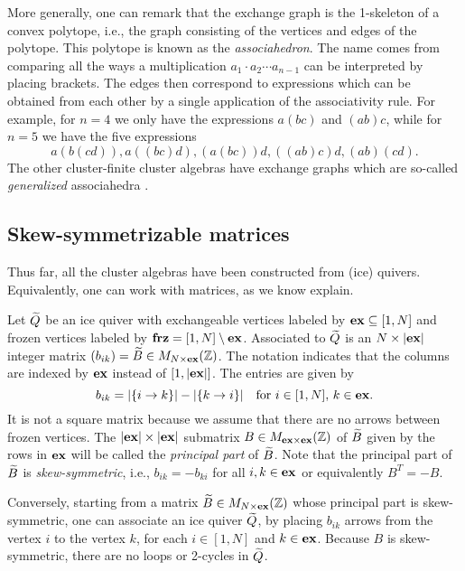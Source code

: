 More generally, one can remark that the exchange graph is the 1-skeleton of a convex
polytope, i.e., the graph consisting of the vertices and edges of the polytope. This
polytope is known as the \emph{associahedron}. The name comes from
comparing all the ways a multiplication $a_1 \cdot a_2 \cdots a_{n-1}$ can be
interpreted by placing brackets. The edges then correspond to expressions which can be
obtained from each other by a single application of the associativity rule. For
example, for $n=4$ we only have the expressions $a(bc)$ and $(ab)c$, while for $n=5$ we
have the five expressions
\begin{equation*}
	a(b(cd)), a((bc)d), (a(bc))d, ((ab)c)d, (ab)(cd).
\end{equation*}
%
The other cluster-finite cluster algebras have exchange graphs which are so-called
\emph{generalized} associahedra \parencite[Theorem 1.13]{FominZelevinsky2003CAFin}.

\subsection{Skew-symmetrizable matrices}

Thus far, all the cluster algebras have been constructed from (ice) quivers.
Equivalently, one can work with matrices, as we know explain.

Let $\widetilde{Q}$ be an ice quiver with exchangeable vertices labeled by $\mathbf{ex} \subseteq [1, N]$
and frozen vertices labeled by $\mathbf{frz} = [1, N] \setminus \mathbf{ex}$. Associated to $\widetilde{Q}$ is an
$N \times |\mathbf{ex}|$ integer matrix $(b_{ik}) = \widetilde{B} \in M_{N \times \mathbf{ex}}(\mathbb{Z})$. The
notation indicates that the columns are indexed by $\mathbf{ex}$ instead of $[1, |\mathbf{ex}|]$. The
entries are given by
\begin{equation}\label{eq:quiver_to_matrix}
	b_{ik} = |\{i \to k\}| - |\{k \to i\}| \quad \text{for } i\in [1, N],\,k\in\mathbf{ex}.
\end{equation}
%
It is not a square matrix because we assume that there are no arrows between frozen
vertices. The $|\mathbf{ex}| \times |\mathbf{ex}|$ submatrix $B \in M_{\mathbf{ex} \times \mathbf{ex}}(\mathbb{Z})$ of $\widetilde{B}$
given by the rows in $\mathbf{ex}$ will be called the \emph{principal part} of $\widetilde{B}$. Note that the principal part of $\widetilde{B}$ is
\emph{skew-symmetric}, i.e., $b_{ik}
	= - b_{ki}$ for all $i,k \in \mathbf{ex}$ or equivalently $B^T = - B$.

Conversely, starting from a matrix $\widetilde{B} \in M_{N \times \mathbf{ex}}(\mathbb{Z})$ whose principal
part is skew-symmetric, one can associate an ice quiver $\widetilde{Q}$, by placing $b_{ik}$
arrows from the vertex $i$ to the vertex $k$, for each $i \in [1, N]$ and $k \in \mathbf{ex}$.
Because $B$ is skew-symmetric, there are no loops or 2-cycles in $\widetilde{Q}$.

